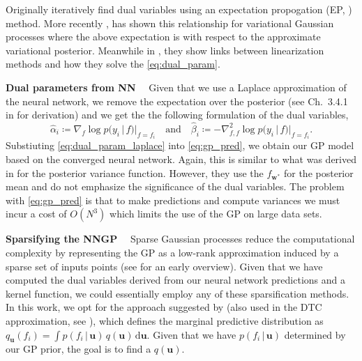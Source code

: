 \documentclass{article}
\renewcommand{\paragraph}[1]{{\bf #1}~~}
\newcommand{\mbf}[1]{\mathbf{#1}}
\renewcommand{\mid}{\,|\,}
\newcommand{\vu}{\mbf{u}}
\newcommand{\vw}{\mbf{w}}
\begin{document}
Originally \citet{csato2002sparse} iteratively find dual variables using an expectation propogation (EP, \cite{minka2001expectation}) method. More recently \cite{khan2017conjugate,adam2021dual}, has shown this relationship for variational Gaussian processes where the above expectation is with respect to the approximate variational posterior. Meanwhile in \citet{wilkinson2023bayes}, they show links between linearization methods and how they solve the \cref{eq:dual_param}.

\paragraph{Dual parameters from NN}
Given that we use a Laplace approximation of the neural network, we remove the expectation over the posterior (see Ch.~3.4.1 in \cite{rasmussen2006gaussian} for derivation) and we get the the following formulation of the dual variables,
%
\begin{equation}
  \label{eq:dual_param_laplace}
  \hat{\alpha}_i \coloneqq \nabla_{f}\log p(y_i \mid f) |_{f=f_i}
  \quad \text{and} \quad
  \hat{\beta}_i \coloneqq - \nabla^2_{f,f}\log p(y_i \mid f) |_{f=f_i}.
\end{equation}
%
Substiuting \cref{eq:dual_param_laplace} into \cref{eq:gp_pred}, we obtain our GP model based on the converged neural network. Again, this is similar to what was derived in \citet{immer2021improving} for the posterior variance function. However, they use the $f_{\vw^*}$ for the posterior mean and do not emphasize the significance of the dual variables. The problem with \cref{eq:gp_pred} is that to make predictions and compute variances we must incur a cost of $O(N^3)$ which limits the use of the GP on large data sets.

\paragraph{Sparsifying the NNGP}
\label{sec:sparse-dual-gp}
%
Sparse Gaussian processes reduce the computational complexity by representing the GP as a low-rank approximation induced by a sparse set of inputs points (see \cite{quinonero2005unifying} for an early overview). Given that we have computed the dual variables derived from our neural network predictions and a kernel function, we could essentially employ any of these sparsification methods. In this work, we opt for the approach suggested by \citet{titsias2009variational} (also used in the DTC approximation, see \cite{quinonero2005unifying}), which defines the marginal predictive distribution as $q_{\vu}(f_i)  = \int p(f_i  \mid \vu) \, q(\vu) \, \mathrm{d}\vu$. Given that we have $p(f_i \mid \vu)$ determined by our GP prior, the goal is to find a $q(\vu)$. 
\end{document}
